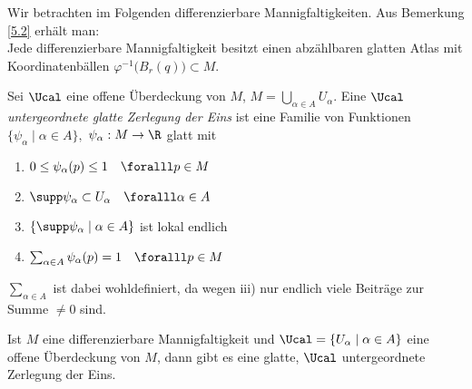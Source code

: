 \begin{rem}
	Wir betrachten im Folgenden differenzierbare Mannigfaltigkeiten. Aus Bemerkung \ref{5.2} erhält man:\\
	Jede differenzierbare Mannigfaltigkeit besitzt einen abzählbaren glatten Atlas mit Koordinatenbällen $ \varphi^{-1}\big(B_r(q)\big) \subset M. $
\end{rem}

\begin{defn*}
	Sei $ \Ucal $ eine offene Überdeckung von $M$, $M = \bigcup_{\alpha \in A} U_\alpha$. Eine \emph{$\Ucal$ untergeordnete glatte Zerlegung der Eins} ist eine Familie von Funktionen $ \{\psi_\alpha \mid \alpha \in A\}, $ $ \psi_\alpha: M \to \R $ glatt mit
	\begin{enumerate}[label={\roman*})]
		\item $ 0 \leq \psi_\alpha(p) \leq 1 \quad \foralll p \in M $
		\item $ \supp \psi_\alpha \subset U_\alpha \quad \foralll \alpha \in A $
		\item $ \{\supp \psi_\alpha \mid \alpha \in A\} $ ist lokal endlich
		\item $ \sum_{\alpha \in A} \psi_\alpha (p) = 1 \quad \foralll p \in M $
	\end{enumerate}
	$ \sum_{\alpha \in A} $ ist dabei wohldefiniert, da wegen iii) nur endlich viele Beiträge zur Summe $\neq 0$ sind.
\end{defn*}

\begin{thm}
	Ist $M$ eine differenzierbare Mannigfaltigkeit und $ \Ucal = \{U_\alpha \mid \alpha \in A\} $ eine offene Überdeckung von $M$, dann gibt es eine glatte, $\Ucal$ untergeordnete Zerlegung der Eins.
\end{thm}

